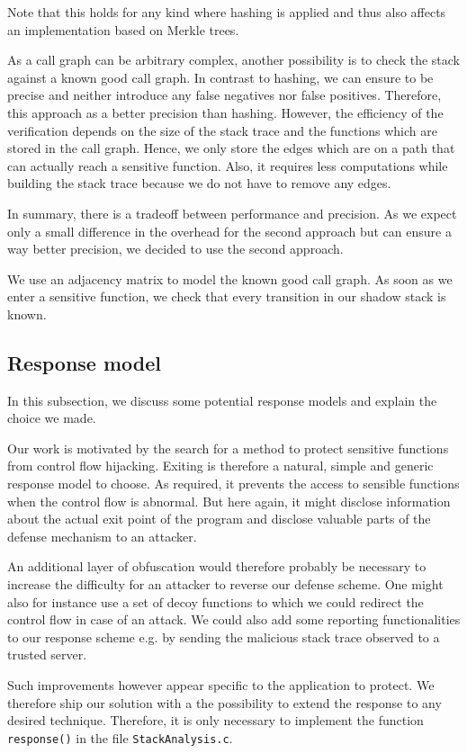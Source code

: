 \documentclass{llncs}
\begin{document}
Note that this holds for any kind where hashing is applied and thus also affects an implementation based on Merkle trees.

As a call graph can be arbitrary complex, another possibility is to check the stack against a known good call graph. In contrast to hashing, we can ensure to be precise and neither introduce any false negatives nor false positives. Therefore, this approach as a better precision than hashing. However, the efficiency of the verification depends on the size of the stack trace and the functions which are stored in the call graph. Hence, we only store the edges which are on a path that can actually reach a sensitive function. Also, it requires less computations while building the stack trace because we do not have to remove any edges.

In summary, there is a tradeoff between performance and precision. As we expect only a small difference in the overhead for the second approach but can ensure a way better precision, we decided to use the second approach.

We use an adjacency matrix to model the known good call graph. As soon as we enter a sensitive function, we check that every transition in our shadow stack is known.

\subsection{Response model}
In this subsection, we discuss some potential response models and explain the choice we made.

Our work is motivated by the search for a method to protect sensitive functions from control flow hijacking. Exiting is therefore a natural, simple and generic response model to choose. As required, it prevents the access to sensible functions when the control flow is abnormal. But here again, it might disclose information about the actual exit point of the program and disclose valuable parts of the defense mechanism to an attacker.

An additional layer of obfuscation would therefore probably be necessary to increase the difficulty for an attacker to reverse our defense scheme. One might also for instance use a set of decoy functions to which we could redirect the control flow in case of an attack. We could also add some reporting functionalities to our response scheme e.g. by sending the malicious stack trace observed to a trusted server.

Such improvements however appear specific to the application to protect. We therefore ship our solution with a the possibility to extend the response to any desired technique. Therefore, it is only necessary to implement the function \texttt{response()} in the file \texttt{StackAnalysis.c}.
\end{document}

